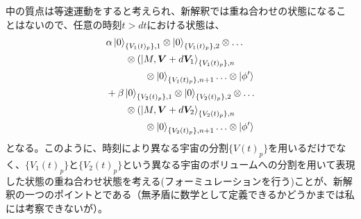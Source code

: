 中の質点は等速運動をすると考えられ、新解釈では重ね合わせの状態になることはないので、任意の時刻$t>dt$における状態は、
\begin{equation}
\begin{aligned}
    &\alpha \ket{0}_{\{V_1(t)_p\},1}  \otimes \ket{0}_{\{V_1(t)_p\},2} \otimes \ldots \\ 
    & \qquad \otimes (\ket{M,\bm{V}+d\bm{V}_1}_{\{V_1(t)_p\},n} \\
    & \qquad \qquad \otimes \ket{0}_{\{V_1(t)_p\},n+1} \ldots \otimes \ket{\phi'} \\ 
    & + \beta \ket{0}_{\{V_2(t)_p\},1}  \otimes \ket{0}_{\{V_2(t)_p\},2} \otimes \ldots \\ 
    & \qquad \otimes (\ket{M,\bm{V}+d\bm{V}_2}_{\{V_2(t)_p\},n} \\
    & \qquad \qquad \otimes \ket{0}_{\{V_2(t)_p\},n+1} \ldots \otimes \ket{\phi'} 
\end{aligned}
\end{equation}
となる。このように、時刻により異なる宇宙の分割$\{V(t)_p\}$を用いるだけでなく、$\{V_1(t)_p\}$と$\{V_2(t)_p\}$という異なる宇宙のボリュームへの分割を用いて表現した状態の重ね合わせ状態を考える(フォーミュレーションを行う)ことが、新解釈の一つのポイントとである（無矛盾に数学として定義できるかどうかまでは私には考察できないが）。